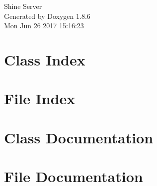 \documentclass[twoside]{book}
\newcommand{\clearemptydoublepage}{%
  \newpage{\pagestyle{empty}\cleardoublepage}%
}
\begin{document}
\hypersetup{pageanchor=false}
\begin{titlepage}
\vspace*{7cm}
\begin{center}%
{\Large Shine Server }\\
\vspace*{1cm}
{\large Generated by Doxygen 1.8.6}\\
\vspace*{0.5cm}
{\small Mon Jun 26 2017 15:16:23}\\
\end{center}
\end{titlepage}
\clearemptydoublepage
\tableofcontents
\clearemptydoublepage
{}
\hypersetup{pageanchor=true}

\chapter{Class Index}

\chapter{File Index}

\chapter{Class Documentation}













\chapter{File Documentation}



























\newpage
{}
{}
\printindex
\end{document}
